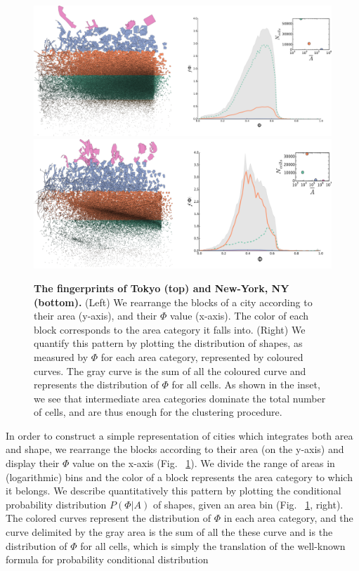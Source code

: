 \begin{figure}
    \center
    \includegraphics[width=\textwidth]{./gfx/chapter-networks/steps_tokyo.png}
    \includegraphics[width=\textwidth]{./gfx/chapter-networks/steps_ny.png}
    \caption{{\bf The fingerprints of Tokyo (top) and New-York, NY (bottom).}
    (Left) We rearrange the blocks of a city according to their area (y-axis), and
    their  $\Phi$ value (x-axis). The color of each block corresponds to the area
    category it falls into.  (Right) We quantify this pattern by plotting the
    distribution of shapes, as measured by $\Phi$ for each area category,
    represented by coloured curves. The gray curve is the sum of all the coloured
    curve and represents the distribution of $\Phi$ for all cells. As shown in the
    inset, we see that intermediate area categories dominate the total number of
    cells, and are thus enough for the clustering procedure.\label{fig:fingerprint}}
\end{figure}

In order to construct a simple representation of cities which integrates both
area and shape, we rearrange the blocks according to their area (on the y-axis)
and display their $\Phi$ value on the x-axis (Fig.~ \ref{fig:fingerprint}). We
divide the range of areas in (logarithmic) bins and the color of a block
represents the area category to which it belongs. We describe quantitatively
this pattern by plotting the conditional probability distribution $P(\Phi|A)$ of
shapes, given an area bin (Fig.~ \ref{fig:fingerprint}, right). The colored
curves represent the distribution of $\Phi$ in each area category, and the curve
delimited by the gray area is the sum of all the these curve and is the
distribution of $\Phi$ for all cells, which is simply the translation of the
well-known formula for probability conditional distribution

